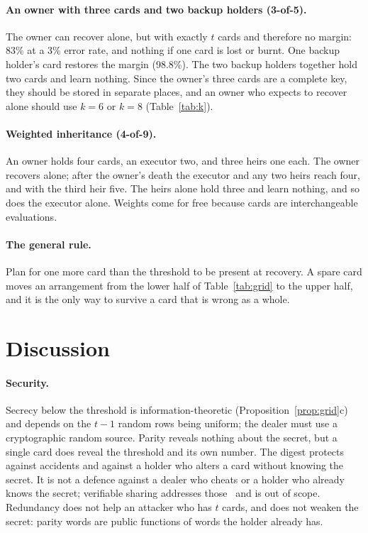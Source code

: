 \documentclass[numeric]{anvil-paper}
\begin{document}
\paragraph{An owner with three cards and two backup holders (3-of-5).}
The owner can recover alone, but with exactly $t$ cards and therefore no
margin: 83\% at a 3\% error rate, and nothing if one card is lost or burnt. One
backup holder's card restores the margin (98.8\%). The two backup holders
together hold two cards and learn nothing. Since the owner's three cards are a
complete key, they should be stored in separate places, and an owner who
expects to recover alone should use $k=6$ or $k=8$ (Table~\ref{tab:k}).

\paragraph{Weighted inheritance (4-of-9).}
An owner holds four cards, an executor two, and three heirs one each. The owner
recovers alone; after the owner's death the executor and any two heirs reach
four, and with the third heir five. The heirs alone hold three and learn
nothing, and so does the executor alone. Weights come for free because cards
are interchangeable evaluations.

\paragraph{The general rule.}
Plan for one more card than the threshold to be present at recovery. A spare
card moves an arrangement from the lower half of Table~\ref{tab:grid} to the
upper half, and it is the only way to survive a card that is wrong as a whole.

\section{Discussion}
\label{sec:limits}

\paragraph{Security.}
Secrecy below the threshold is information-theoretic
(Proposition~\ref{prop:grid}c) and depends on the $t-1$ random rows being
uniform; the dealer must use a cryptographic random source. Parity reveals
nothing about the secret, but a single card does reveal the threshold and its
own number. The digest protects against accidents and against a holder who
alters a card without knowing the secret. It is not a defence against a dealer
who cheats or a holder who already knows the secret; verifiable sharing
addresses those~\citep{rabin1989verifiable} and is out of scope. Redundancy
does not help an attacker who has $t$ cards, and does not weaken the secret:
parity words are public functions of words the holder already has.
\end{document}
